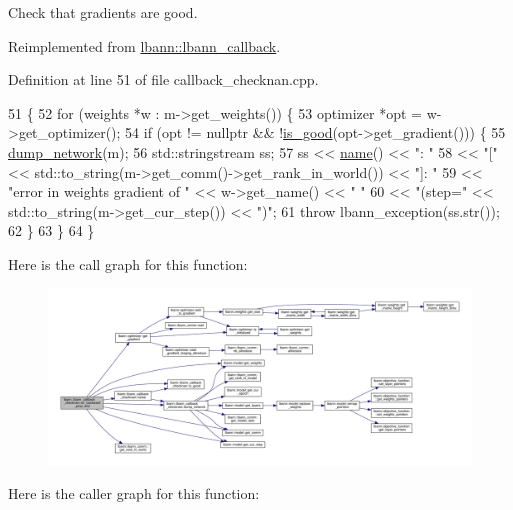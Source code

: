 Check that gradients are good. 

Reimplemented from \hyperlink{classlbann_1_1lbann__callback_af183624e63ba65e0003fa988f53dee0c}{lbann\+::lbann\+\_\+callback}.



Definition at line 51 of file callback\+\_\+checknan.\+cpp.


\begin{DoxyCode}
51                                                            \{
52   \textcolor{keywordflow}{for} (weights *w : m->get\_weights()) \{
53     optimizer *opt = w->get\_optimizer();
54     \textcolor{keywordflow}{if} (opt != \textcolor{keyword}{nullptr} && !\hyperlink{classlbann_1_1lbann__callback__checknan_ac74f7f665823d0500875b9740aaccabc}{is\_good}(opt->get\_gradient())) \{
55       \hyperlink{classlbann_1_1lbann__callback__checknan_a335713a3df9194f657f98cccd2f695f5}{dump\_network}(m);
56       std::stringstream ss;
57       ss << \hyperlink{classlbann_1_1lbann__callback__checknan_ab42c997a06058c3535792408fdd5fed8}{name}() << \textcolor{stringliteral}{": "}
58          << \textcolor{stringliteral}{"["} << std::to\_string(m->get\_comm()->get\_rank\_in\_world()) << \textcolor{stringliteral}{"]: "}
59          << \textcolor{stringliteral}{"error in weights gradient of "} << w->get\_name() << \textcolor{stringliteral}{" "}
60          << \textcolor{stringliteral}{"(step="} << std::to\_string(m->get\_cur\_step()) << \textcolor{stringliteral}{")"};
61       \textcolor{keywordflow}{throw} lbann\_exception(ss.str());
62     \}
63   \}
64 \}
\end{DoxyCode}
Here is the call graph for this function\+:\nopagebreak
\begin{figure}[H]
\begin{center}
\leavevmode
\includegraphics[width=350pt]{classlbann_1_1lbann__callback__checknan_a40d9a9fcc5849746570b99321e1c5488_cgraph}
\end{center}
\end{figure}
Here is the caller graph for this function\+:\nopagebreak
